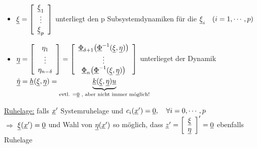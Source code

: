 \documentclass[openany,a4paper,11pt]{book}
\begin{document}
\begin{itemize}
    \item $\uline{\xi}=\left[ \begin{array}{c} \uline{\xi}_1\\ \vdots\\ \uline{\xi}_p\\ \end{array} \right]$ unterliegt den p Subsystemdynamiken für die $\uline{\xi}_i \quad(i=1,\cdots,p)$\\
    \begin{minipage}[c]{\textwidth}
    \end{minipage}
    \item $\uline{\eta}=\left[ \begin{array}{c} \eta_1\\ \vdots\\ \eta_{n-\delta}\\ \end{array} \right]=\left[ \begin{array}{c} \uline{\Phi}_{\delta+1}\big(\uline{\Phi}^{-1}(\uline{\xi},\uline{\eta})\big)\\ \vdots\\ \uline{\Phi}_n\big(\uline{\Phi}^{-1}(\uline{\xi},\uline{\eta})\big)\\ \end{array} \right]$ unterlieget der Dynamik\\
    $\uline{\dot{\eta}}=\uline{h}(\uline{\xi},\uline{\eta})=\underbrace{\uline{k}(\uline{\xi},\uline{\eta})\uline{u}}_{\text{evtl. }=\uline{0}\text{ , aber nicht immer möglich!}}$
\end{itemize}
\uline{Ruhelage:} falls $\uline{x}'$ Systemruhelage und $c_i(\uline{x}')=\uline{0},\quad \forall i=0,\cdots,p$\\
$\Rightarrow$ $\uline{\xi}(\uline{x}')=\uline{0}$ und Wahl von $\uline{\eta}(\uline{x}')$ so möglich, dass $\uline{z}'=\left[ \begin{array}{c} \uline{\xi}\\ \uline{\eta}\\ \end{array} \right]'=\uline{0}$ ebenfalls Ruhelage 
\end{document}
